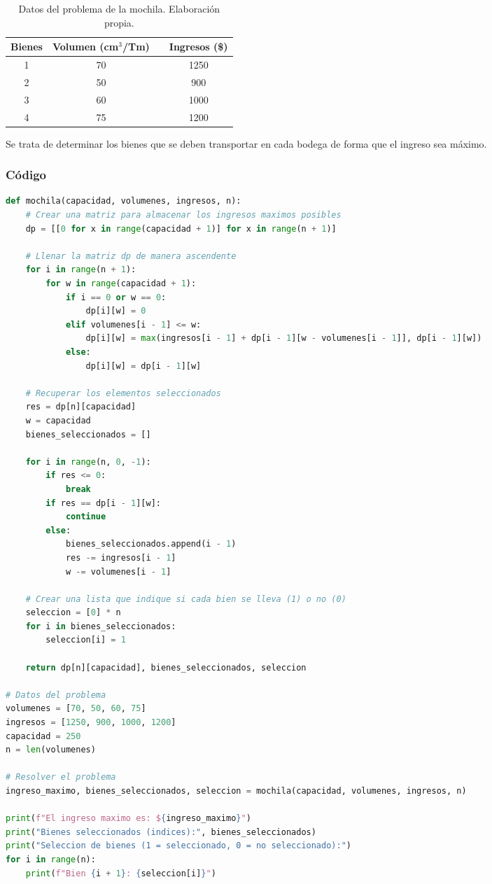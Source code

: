 \begin{table}[H]
    \centering
    \begin{tabular}{cccc}
        \toprule
        \textbf{Bienes} & \textbf{Volumen (cm\(^3\)/Tm)} & & \textbf{Ingresos (\$)} \\
        \midrule
        1 & 70 & & 1250 \\
        2 & 50 & & 900 \\
        3 & 60 & & 1000 \\
        4 & 75 & & 1200 \\
        \bottomrule
    \end{tabular}
    \caption{Datos del problema de la mochila. Elaboración propia.}
    \label{tab:datos_problema}
\end{table}

Se trata de determinar los bienes que se deben transportar en cada bodega de forma que el ingreso sea máximo.

\subsubsection{Código}
\begin{lstlisting}[language=Python]
def mochila(capacidad, volumenes, ingresos, n):
    # Crear una matriz para almacenar los ingresos maximos posibles
    dp = [[0 for x in range(capacidad + 1)] for x in range(n + 1)]

    # Llenar la matriz dp de manera ascendente
    for i in range(n + 1):
        for w in range(capacidad + 1):
            if i == 0 or w == 0:
                dp[i][w] = 0
            elif volumenes[i - 1] <= w:
                dp[i][w] = max(ingresos[i - 1] + dp[i - 1][w - volumenes[i - 1]], dp[i - 1][w])
            else:
                dp[i][w] = dp[i - 1][w]

    # Recuperar los elementos seleccionados
    res = dp[n][capacidad]
    w = capacidad
    bienes_seleccionados = []

    for i in range(n, 0, -1):
        if res <= 0:
            break
        if res == dp[i - 1][w]:
            continue
        else:
            bienes_seleccionados.append(i - 1)
            res -= ingresos[i - 1]
            w -= volumenes[i - 1]

    # Crear una lista que indique si cada bien se lleva (1) o no (0)
    seleccion = [0] * n
    for i in bienes_seleccionados:
        seleccion[i] = 1

    return dp[n][capacidad], bienes_seleccionados, seleccion

# Datos del problema
volumenes = [70, 50, 60, 75]
ingresos = [1250, 900, 1000, 1200]
capacidad = 250
n = len(volumenes)

# Resolver el problema
ingreso_maximo, bienes_seleccionados, seleccion = mochila(capacidad, volumenes, ingresos, n)

print(f"El ingreso maximo es: ${ingreso_maximo}")
print("Bienes seleccionados (indices):", bienes_seleccionados)
print("Seleccion de bienes (1 = seleccionado, 0 = no seleccionado):")
for i in range(n):
    print(f"Bien {i + 1}: {seleccion[i]}")
\end{lstlisting}

